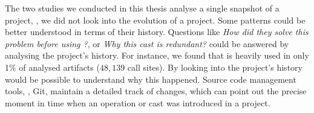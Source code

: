 The two studies we conducted in this thesis analyse a single snapshot of a project,
\ie{}, we did not look into the evolution of a project.
Some patterns could be better understood in terms of their history.
Questions like
\emph{How did they solve this problem before using \unsafe{}?},
or \emph{Why this cast is redundant?}
could be answered by analysing the project's history. 
For instance,
we found that \smu{} is heavily used in only 1\% of analysed artifacts
($48,139$ call sites).
By looking into the project's history would be possible to understand why this happened.
Source code management tools, \eg{}, Git,
maintain a detailed track of changes,
which can point out the precise moment in time when an \unsafe{} operation or cast was introduced in a project.


